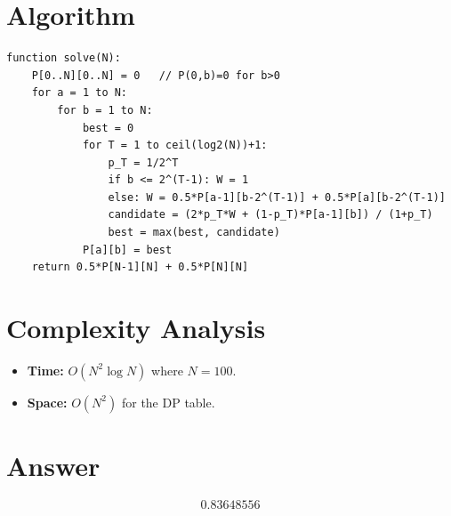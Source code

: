 \documentclass[12pt]{article}
\begin{document}
\section{Algorithm}

\begin{verbatim}
function solve(N):
    P[0..N][0..N] = 0   // P(0,b)=0 for b>0
    for a = 1 to N:
        for b = 1 to N:
            best = 0
            for T = 1 to ceil(log2(N))+1:
                p_T = 1/2^T
                if b <= 2^(T-1): W = 1
                else: W = 0.5*P[a-1][b-2^(T-1)] + 0.5*P[a][b-2^(T-1)]
                candidate = (2*p_T*W + (1-p_T)*P[a-1][b]) / (1+p_T)
                best = max(best, candidate)
            P[a][b] = best
    return 0.5*P[N-1][N] + 0.5*P[N][N]
\end{verbatim}

\section{Complexity Analysis}
\begin{itemize}
    \item \textbf{Time:} $O(N^2 \log N)$ where $N = 100$.
    \item \textbf{Space:} $O(N^2)$ for the DP table.
\end{itemize}

\section{Answer}

\[
\boxed{0.83648556}
\]
\end{document}
